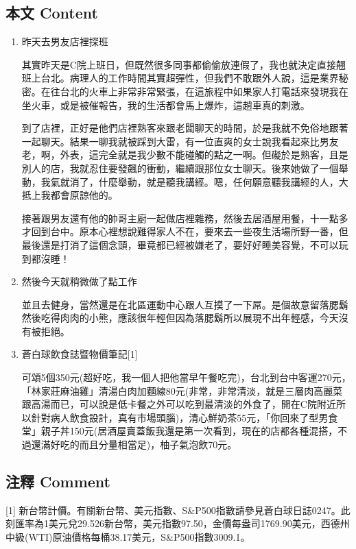 \documentclass[
]{article}
\begin{document}
\hypertarget{ux672cux6587-content-22}{%
\subsection{本文 Content}\label{ux672cux6587-content-22}}

\begin{enumerate}
\def\labelenumi{\arabic{enumi}.}
\item
  昨天去男友店裡探班

  其實昨天是C院上班日，但既然很多同事都偷偷放連假了，我也就決定直接翹班上台北。病理人的工作時間其實超彈性，但我們不敢跟外人說，這是業界秘密。在往台北的火車上非常非常緊張，在這旅程中如果家人打電話來發現我在坐火車，或是被催報告，我的生活都會馬上爆炸，這趟車真的刺激。

  到了店裡，正好是他們店裡熟客來跟老闆聊天的時間，於是我就不免俗地跟著一起聊天。結果一聊我就被踩到大雷，有一位直爽的女士說我看起來比男友老，啊，外表，這完全就是我少數不能碰觸的點之一啊。但礙於是熟客，且是別人的店，我就忍住要發飆的衝動，繼續跟那位女士聊天。後來她做了一個舉動，我氣就消了，什麼舉動，就是聽我講經。嗯，任何願意聽我講經的人，大抵上我都會原諒他的。

  接著跟男友還有他的帥哥主廚一起做店裡雜務，然後去居酒屋用餐，十一點多才回到台中。原本心裡想說難得家人不在，要來去一些夜生活場所野一番，但最後還是打消了這個念頭，畢竟都已經被嫌老了，要好好睡美容覺，不可以玩到都沒睡！
\item
  然後今天就稍微做了點工作

  並且去健身，當然還是在北區運動中心跟人互摸了一下屌。是個故意留落腮鬍然後吃得肉肉的小熊，應該很年輕但因為落腮鬍所以展現不出年輕感，今天沒有被拒絕。
\item
  蒼白球飲食誌暨物價筆記{[}1{]}

  可頌5個350元(超好吃，我一個人把他當早午餐吃完)，台北到台中客運270元，「林家莊麻油雞」清湯白肉加麵線80元(非常，非常清淡，就是三層肉高麗菜跟高湯而已，可以說是低卡餐之外可以吃到最清淡的外食了，開在C院附近所以針對病人飲食設計，真有市場頭腦)，清心鮮奶茶55元，「你回來了型男食堂」親子丼150元(居酒屋賣蓋飯我還是第一次看到，現在的店都各種混搭，不過還滿好吃的而且分量相當足)，柚子氣泡飲70元。
\end{enumerate}

\hypertarget{ux6ce8ux91cb-comment-22}{%
\subsection{注釋 Comment}\label{ux6ce8ux91cb-comment-22}}

{[}1{]}
新台幣計價。有關新台幣、美元指數、S\&P500指數請參見蒼白球日誌0247。此刻匯率為1美元兌29.526新台幣，美元指數97.50，金價每盎司1769.90美元，西德州中級(WTI)原油價格每桶38.17美元，S\&P500指數3009.1。
\end{document}
